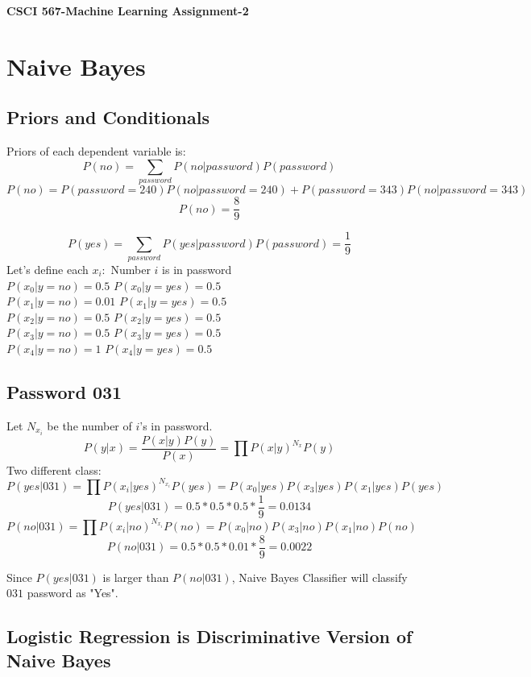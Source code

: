 \documentclass[letter,11pt]{article}
\begin{document}
	\begin{center}
		\Large\textbf{CSCI 567-Machine Learning Assignment-2}
	\end{center}
	
	\section{Naive Bayes}
	\subsection{Priors and Conditionals}
	Priors of each dependent variable is:
	$$P(no) = \sum_{password} P(no|password)P(password)$$
	$$P(no) = P(password = 240)P(no|password = 240) + P(password = 343)P(no|password =343)$$
	$$P(no) = \frac{8}{9}$$

	$$P(yes) = \sum_{password} P(yes|password)P(password) = \frac{1}{9}$$
	Let's define each $x_i:$ Number $i$ is in password\\
	$P(x_0|y = no) = 0.5$   \hspace{10mm}	$P(x_0|y = yes) = 0.5$\\
	$P(x_1|y = no) = 0.01$\hspace{9mm}	$P(x_1|y = yes) = 0.5$\\
	$P(x_2|y = no) = 0.5$\hspace{10mm}	$P(x_2|y = yes) = 0.5$\\
	$P(x_3|y = no) = 0.5$\hspace{10mm}	$P(x_3|y = yes) = 0.5$\\
    $P(x_4|y = no) = 1$\hspace{12mm}	$P(x_4|y = yes) = 0.5$\\
    
	\subsection{Password 031}
	Let $N_{x_i}$ be the number of $i$'s in password.
	$$P(y|x) = \frac{P(x|y)P(y)}{P(x)}=\prod P(x|y)^{N_x}P(y)$$
	Two different class:
	$$P(yes|031) = \prod P(x_i|yes)^{N_{x_i}}P(yes) = P(x_0|yes)P(x_3|yes)P(x_1|yes)P(yes)$$
	$$P(yes|031) = 0.5*0.5*0.5*\frac{1}{9} = 0.0134$$
	$$P(no|031) = \prod P(x_i|no)^{N_{x_i}}P(no) = P(x_0|no)P(x_3|no)P(x_1|no)P(no)$$
	$$P(no|031) = 0.5*0.5*0.01*\frac{8}{9} = 0.0022$$	
	
	Since $P(yes|031)$ is larger than $P(no|031)$, Naive Bayes Classifier will classify $031$ password as "Yes".
	
	\subsection{Logistic Regression is Discriminative Version of Naive Bayes}
 
\end{document}
